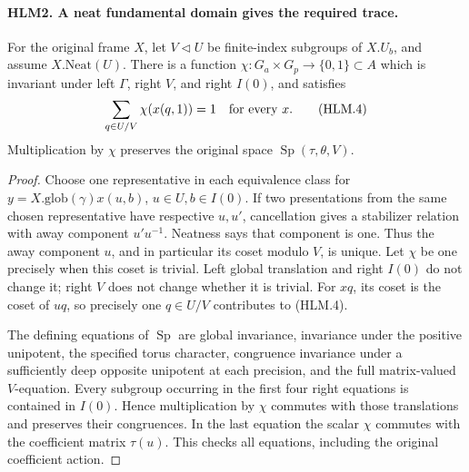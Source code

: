 \documentclass[11pt,a4paper]{article}
\numberwithin{equation}{section}
\theoremstyle{remark}\newtheorem{remark}[theorem]{Remark}
\begin{document}
\paragraph{HLM2. A neat fundamental domain gives the required trace.}
\label{claim:HLM2}
For the original frame \(X\), let \(V\triangleleft U\) be
finite-index subgroups of \(X.U_b\), and assume \(X.\mathrm{Neat}(U)\).
There is a function \(\chi:G_a\times G_p\to\{0,1\}\subset A\)
which is invariant under left \(\Gamma\), right \(V\), and
right \(I(0)\), and satisfies
\[
     \sum_{q\in U/V}\chi(x(q,1))=1\quad\hbox{for every }x.
 \tag{HLM.4}
\]
Multiplication by \(\chi\) preserves the original space
\(\operatorname{Sp}(\tau,\theta,V)\).
\begin{proof}
Choose one representative in each equivalence class for
\(y=X.\mathrm{glob}(\gamma)x(u,b)\),
\(u\in U,b\in I(0)\).  If two presentations from the same
chosen representative have respective \(u,u'\), cancellation
gives a stabilizer relation with away component \(u'u^{-1}\).
Neatness says that component is one.  Thus the away component
\(u\), and in particular its coset modulo \(V\), is unique.
Let \(\chi\) be one precisely when this coset is trivial.
Left global translation and right \(I(0)\) do not change it;
right \(V\) does not change whether it is trivial.  For
\(xq\), its coset is the coset of \(uq\), so precisely one
\(q\in U/V\) contributes to (HLM.4).

The defining equations of \(\operatorname{Sp}\) are global
invariance, invariance under the positive unipotent, the specified
torus character, congruence invariance under a sufficiently deep
opposite unipotent at each precision, and the full matrix-valued
\(V\)-equation.  Every subgroup occurring in the first four
right equations is contained in \(I(0)\).  Hence multiplication
by \(\chi\) commutes with those translations and preserves
their congruences.  In the last equation the scalar \(\chi\)
commutes with the coefficient matrix \(\tau(u)\).  This checks
all equations, including the original coefficient action.
\end{proof}

\end{document}
